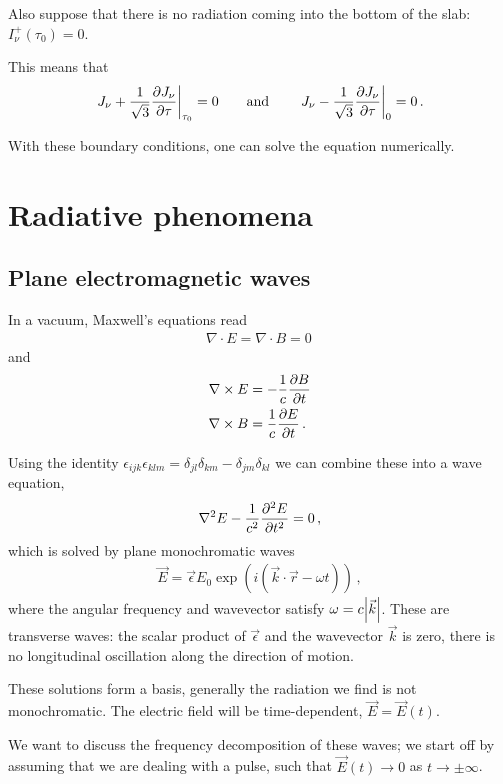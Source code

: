 \documentclass[main.tex]{subfiles}
\begin{document}
Also suppose that there is no radiation coming into the bottom of the slab: \(I_\nu^{+} (\tau_0 ) = 0\). 

This means that 
%
\begin{align}
\eval{J_\nu + \frac{1}{\sqrt{3}} \pdv{J_\nu }{\tau }}_{\tau_0 } = 0
\qquad \text{and} \qquad
\eval{J_\nu - \frac{1}{\sqrt{3}} \pdv{J_\nu }{\tau }}_{0} = 0
\,. 
\end{align}

With these boundary conditions, one can solve the equation numerically.

\chapter{Radiative phenomena}

\section{Plane electromagnetic waves}

In a vacuum, Maxwell's equations read 
%
\begin{align}
\nabla \cdot E = \nabla \cdot B =0
\,
\end{align}
%
and 
%
\begin{align}
\nabla \times E &= - \frac{1}{c} \pdv{B}{t}  \\
\nabla \times B &= \frac{1}{c} \pdv{E}{t}
\,.
\end{align}

Using the identity \(\epsilon_{ijk} \epsilon_{klm} = \delta_{jl} \delta_{km} - \delta_{jm} \delta_{kl}\) we can combine these into a wave equation, 
%
\begin{align}
\nabla^2 E - \frac{1}{c^2} \pdv[2]{E}{t} = 0 
\,,
\end{align}
%
which is solved by plane monochromatic waves 
%
\begin{align}
\vec{E}  =\vec{\epsilon} E_0 \exp(i (\vec{k} \cdot \vec{r} - \omega t))
\,,
\end{align}
%
where the angular frequency and wavevector satisfy \(\omega = c \abs{\vec{k}}\).
These are transverse waves: the scalar product of \(\vec{\epsilon}\) and the wavevector \(\vec{k}\) is zero, there is no longitudinal oscillation along the direction of motion. 

These solutions form a basis, generally the radiation we find is not monochromatic. 
The electric field will be time-dependent, \(\vec{E} = \vec{E} (t)\). 

We want to discuss the frequency decomposition of these waves; we start off by assuming that we are dealing with a pulse, such that \(\vec{E}(t) \rightarrow 0\) as \(t \to \pm \infty \).
\end{document}
